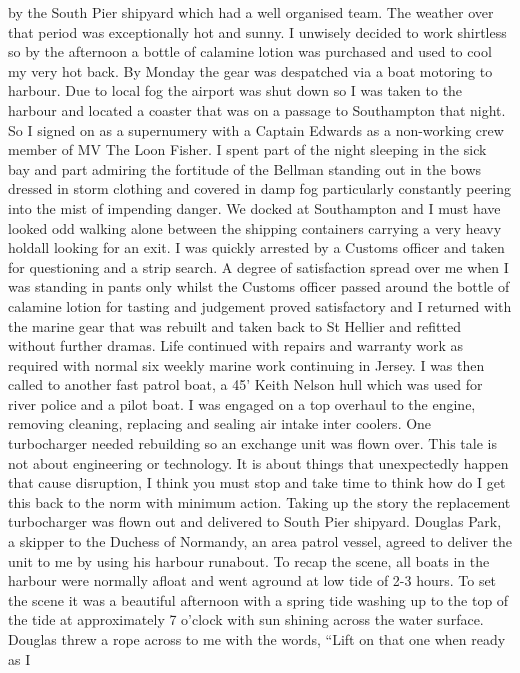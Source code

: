 by the South Pier shipyard which had a well organised team. The weather over
that period was exceptionally hot and sunny. I unwisely decided to work
shirtless so by the afternoon a bottle of calamine lotion was purchased and
used to cool my very hot back. By Monday the gear was despatched via a boat
motoring to harbour. Due to local fog the airport was shut down so I was taken
to the harbour and located a coaster that was on a passage to Southampton that
night. So I signed on as a supernumery with a Captain Edwards as a non-working
crew member of MV The Loon Fisher. I spent part of the night sleeping in the
sick bay and part admiring the fortitude of the Bellman standing out in the
bows dressed in storm clothing and covered in damp fog particularly constantly
peering into the mist of impending danger. We docked at Southampton and I must
have looked odd walking alone between the shipping containers carrying a very
heavy holdall looking for an exit. I was quickly arrested by a Customs officer
and taken for questioning and a strip search. A degree of satisfaction spread
over me when I was standing in pants only whilst the Customs officer passed
around the bottle of calamine lotion for tasting and judgement proved
satisfactory and I returned with the marine gear that was rebuilt and taken
back to St Hellier and refitted without further dramas. Life continued with
repairs and warranty work as required with normal six weekly marine work
continuing in Jersey. I was then called to another fast patrol boat, a 45'
Keith Nelson hull which was used for river police and a pilot boat. I was
engaged on a top overhaul to the engine, removing cleaning, replacing and
sealing air intake inter coolers. One turbocharger needed rebuilding so an
exchange unit was flown over. This tale is not about engineering or technology.
It is about things that unexpectedly happen that cause disruption, I think you
must stop and take time to think how do I get this back to the norm with
minimum action. Taking up the story the replacement turbocharger was flown out
and delivered to South Pier shipyard. Douglas Park, a skipper to the Duchess of
Normandy, an area patrol vessel, agreed to deliver the unit to me by using his
harbour runabout. To recap the scene, all boats in the harbour were normally
afloat and went aground at low tide of 2-3 hours. To set the scene it was a
beautiful afternoon with a spring tide washing up to the top of the tide at
approximately 7 o'clock with sun shining across the water surface. Douglas
threw a rope across to me with the words, ``Lift on that one when ready as I
